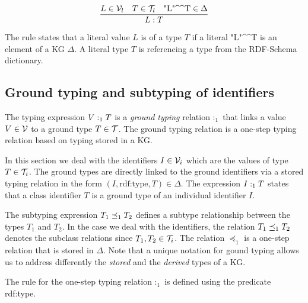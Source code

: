 \documentclass[runningheads]{llncs}
\newcommand{\V}{{\cal V}}
\newcommand{\T}{{\cal T}}
\newcommand{\memo}[1]{}
\newcommand{\notes}[1]{\noindent\begin{small}-- \emph{#1}\hfill\break\end{small}}
\begin{document}
\begin{equation}
\dfrac{L\in\V_l\quad T\in\T_l\quad \text{"L"\textasciicircum\textasciicircum\/T}\in\Delta}
      {L:T}  
\end{equation}

The rule states that a literal value $L$ is of a type $T$ if a literal
"L"\textasciicircum\textasciicircum\/T is an element of a KG
$\Delta$. A literal type $T$ is referencing a type from the RDF-Schema
dictionary.






\subsection{Ground typing and subtyping of identifiers\label{sec:idents-stored}}

The typing expression $V:_1\/T$ is a \emph{ground typing} relation
$:_1$ that links a value $V\in\V$ to a ground type $T\in\T$. The
ground typing relation is a one-step typing relation based on typing
stored in a KG.

In this section we deal with the identifiers $I\in\V_i$ which are the
values of type $T\in\T_i$. The ground types are directly linked to the
ground identifiers via a stored typing relation in the form
$(I,\text{rdf:type},T)\in\Delta$. The expression $I:_1\/T$ states that a
class identifier $T$ is a ground type of an individual identifier $I$.

The subtyping expression $T_1\preceq_1\/T_2$ defines a subtype
relationship between the types $T_1$ and $T_2$. In the case we deal
with the identifiers, the relation $T_1\preceq_1\/T_2$ denotes the
subclass relations since $T_1,T_2\in\T_i$. The relation $\preceq_1$ is
a one-step relation that is stored in $\Delta$. Note that a unique
notation for gound typing allows us to address differently the
\emph{stored} and the \emph{derived} types of a KG.


\memo{Oportunity to introduce ``mixed'' objects including ground and schema components.}

The rule for the one-step typing relation $:_1$ is defined using the
predicate rdf:type.
\end{document}
